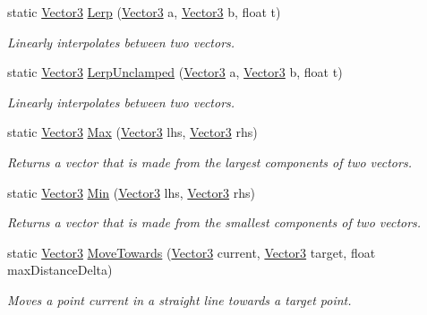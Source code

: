 \begin{DoxyCompactItemize}
static \mbox{\hyperlink{class_lua_1_1_vector3}{Vector3}} \mbox{\hyperlink{class_lua_1_1_vector3_a2ac180084d2490e519612ccba40da454}{Lerp}} (\mbox{\hyperlink{class_lua_1_1_vector3}{Vector3}} a, \mbox{\hyperlink{class_lua_1_1_vector3}{Vector3}} b, float t)
\begin{DoxyCompactList}\small\item\em Linearly interpolates between two vectors. \end{DoxyCompactList}\item 
static \mbox{\hyperlink{class_lua_1_1_vector3}{Vector3}} \mbox{\hyperlink{class_lua_1_1_vector3_a63b62cb18ab91477aee5c9bd0d975400}{Lerp\+Unclamped}} (\mbox{\hyperlink{class_lua_1_1_vector3}{Vector3}} a, \mbox{\hyperlink{class_lua_1_1_vector3}{Vector3}} b, float t)
\begin{DoxyCompactList}\small\item\em Linearly interpolates between two vectors. \end{DoxyCompactList}\item 
static \mbox{\hyperlink{class_lua_1_1_vector3}{Vector3}} \mbox{\hyperlink{class_lua_1_1_vector3_a3495c2bc3847d7ec201c1e4209359c25}{Max}} (\mbox{\hyperlink{class_lua_1_1_vector3}{Vector3}} lhs, \mbox{\hyperlink{class_lua_1_1_vector3}{Vector3}} rhs)
\begin{DoxyCompactList}\small\item\em Returns a vector that is made from the largest components of two vectors. \end{DoxyCompactList}\item 
static \mbox{\hyperlink{class_lua_1_1_vector3}{Vector3}} \mbox{\hyperlink{class_lua_1_1_vector3_a514e1f8b6c974e522e290ccf3f113a7e}{Min}} (\mbox{\hyperlink{class_lua_1_1_vector3}{Vector3}} lhs, \mbox{\hyperlink{class_lua_1_1_vector3}{Vector3}} rhs)
\begin{DoxyCompactList}\small\item\em Returns a vector that is made from the smallest components of two vectors. \end{DoxyCompactList}\item 
static \mbox{\hyperlink{class_lua_1_1_vector3}{Vector3}} \mbox{\hyperlink{class_lua_1_1_vector3_aa4b2a5ff6af794cc8a83617227bee73b}{Move\+Towards}} (\mbox{\hyperlink{class_lua_1_1_vector3}{Vector3}} current, \mbox{\hyperlink{class_lua_1_1_vector3}{Vector3}} target, float max\+Distance\+Delta)
\begin{DoxyCompactList}\small\item\em Moves a point current in a straight line towards a target point. \end{DoxyCompactList}\item 

\end{DoxyCompactItemize}
